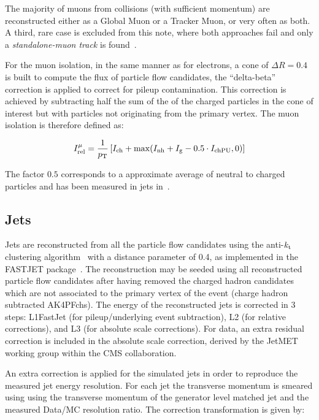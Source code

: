 The majority of muons from collisions (with sufficient momentum) are reconstructed either 
as a Global Muon or a Tracker Muon, or very often as both.
A third, rare case is excluded from this note, where both approaches fail and only a {\em standalone-muon track} is found~\cite{CMS-PAS-MUO-10-004}.

For the muon isolation, in the same manner as for electrons, a cone of $\Delta R = 0.4$ is built to compute the flux of particle flow candidates,
the ``delta-beta'' correction is applied to correct for pileup contamination. This correction is achieved by
subtracting half the sum of the \pt of the charged particles in the cone of interest but with particles not originating from the primary vertex.
The muon isolation is therefore defined as:

\begin{equation}
I^{\mu}_{\rm rel}=\frac{1}{p_{\rm T}}  \left[ I_{\rm ch}+\max(I_{\rm nh}+I_{\rm g}-0.5\cdot I_{\rm chPU} ,0) \right]
\label{eq:muisol}
\end{equation}

The factor $0.5$ corresponds to a approximate average of neutral to charged particles and has been measured in jets in~\cite{CMS-PAS-PFT-10-002}.

\subsection{Jets}
Jets are reconstructed from all the particle flow candidates using the anti-$k_{\rm t}$ clustering algorithm~\cite{Cacciari:2008gp}
with a distance parameter of 0.4, as implemented in the FASTJET package~\cite{Cacciari:2011ma,Cacciari:2006gp}.
The reconstruction may be seeded using all reconstructed particle flow candidates
after having removed the charged hadron candidates which are not associated to the primary vertex of the event
(charge hadron subtracted AK4PFchs).
The energy of the reconstructed jets is corrected in 3 steps: L1FastJet (for pileup/underlying event subtraction),
L2 (for relative corrections), and L3 (for absolute scale corrections).
For data, an extra residual correction is included in the absolute scale correction,
derived by the JetMET working group within the CMS collaboration.

An extra correction is applied for the simulated jets in order to reproduce the measured jet energy resolution.
For each jet the transverse momentum is smeared using using the transverse momentum of
the generator level matched jet and the measured Data/MC resolution ratio. The correction transformation is given by: 

